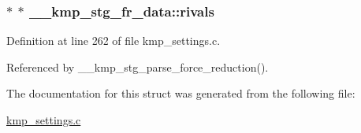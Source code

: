 \hypertarget{struct____kmp__stg__fr__data_a9cfa9921249c7d27a7b887f0bc8e8633}{
\subsubsection[{rivals}]{$\ast$ $\ast$ \-\_\-\-\_\-kmp\-\_\-stg\-\_\-fr\-\_\-data\-::rivals}}\label{struct____kmp__stg__fr__data_a9cfa9921249c7d27a7b887f0bc8e8633}


Definition at line 262 of file kmp\-\_\-settings.\-c.



Referenced by \-\_\-\-\_\-kmp\-\_\-stg\-\_\-parse\-\_\-force\-\_\-reduction().



The documentation for this struct was generated from the following file\-:\begin{DoxyCompactItemize}
\item 
\hyperlink{kmp__settings_8c}{kmp\-\_\-settings.\-c}\end{DoxyCompactItemize}
